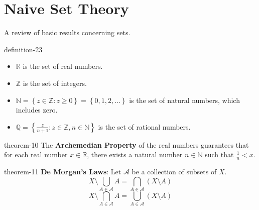 \documentclass[10pt,]{article}
\newcommand{\terminology}[1]{\textbf{#1}}
\newcommand{\mb}{\mathbb}
\newcommand{\mc}{\mathcal}
\newcommand{\setBuilder}[2]{\left\{#1:#2\right\}}
\newcommand{\setList}[1]{\left\{#1\right\}}
\newcommand{\lt}{<}
\begin{document}
\section[{Naive Set Theory}]{Naive Set Theory}\label{set-theory}
\hypertarget{p-75}{}%
A review of basic results concerning sets.%
\begin{definition}{}{definition-23}%
\leavevmode%
\begin{itemize}[label=\textbullet]
\item{}\(\mb R\) is the set of real numbers.%
\item{}\(\mb Z\) is the set of integers.%
\item{}\(\mb N=\setBuilder{z\in\mb Z}{z\geq 0}=\setList{0,1,2,\dots}\) is the set of natural numbers, which includes zero.%
\item{}\(\mb Q=\setBuilder{\frac{z}{n+1}}{z\in\mb Z,n\in\mb N}\) is the set of rational numbers.%
\end{itemize}
\end{definition}
\begin{theorem}{}{}{theorem-10}%
\hypertarget{p-76}{}%
The \terminology{Archemedian Property} of the real numbers guarantees that for each real number \(x\in\mb R\), there exists a natural number \(n\in\mb N\) such that \(\frac{1}{n}\lt x\).%
\end{theorem}
\begin{theorem}{}{}{theorem-11}%
\hypertarget{p-77}{}%
\terminology{De Morgan's Laws}: Let \(\mc A\) be a collection of subsets of \(X\).%
%
\begin{equation*}
X\setminus\bigcup_{A\in\mc A}A=\bigcap_{A\in\mc A}(X\setminus A)
\end{equation*}
%
\begin{equation*}
X\setminus\bigcap_{A\in\mc A}A=\bigcup_{A\in\mc A}(X\setminus A)
\end{equation*}
\end{theorem}
\end{document}
